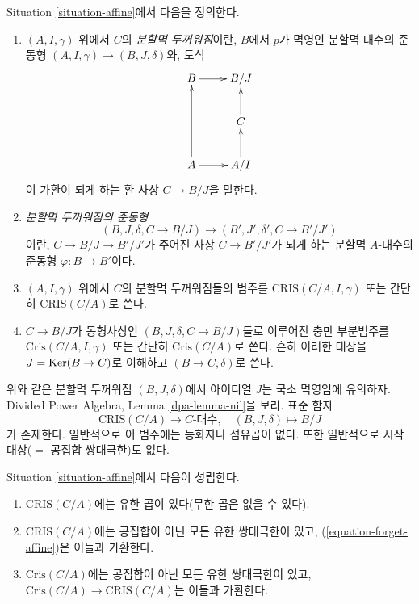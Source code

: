 \begin{definition}
\label{definition-affine-thickening}
Situation \ref{situation-affine}에서 다음을 정의한다.
\begin{enumerate}
\item $(A, I, \gamma)$ 위에서 $C$의 {\it 분할멱 두꺼워짐}이란,
$B$에서 $p$가 멱영인 분할멱 대수의 준동형
$(A, I, \gamma) \to (B, J, \delta)$와, 도식
$$
\xymatrix{
B \ar[r] & B/J \\
& C \ar[u] \\
A \ar[uu] \ar[r] & A/I \ar[u]
}
$$
이 가환이 되게 하는 환 사상 $C \to B/J$을 말한다.
\item {\it 분할멱 두꺼워짐의 준동형}
$$
(B, J, \delta, C \to B/J) \longrightarrow (B', J', \delta', C \to B'/J')
$$
이란, $C \to B/J \to B'/J'$가 주어진 사상 $C \to B'/J'$가
되게 하는 분할멱 $A$-대수의 준동형 $\varphi : B \to B'$이다.
\item $(A, I, \gamma)$ 위에서 $C$의 분할멱 두꺼워짐들의 범주를
$\text{CRIS}(C/A, I, \gamma)$ 또는 간단히 $\text{CRIS}(C/A)$로 쓴다.
\item $C \to B/J$가 동형사상인 $(B, J, \delta, C \to B/J)$들로
이루어진 충만 부분범주를 $\text{Cris}(C/A, I, \gamma)$ 또는
간단히 $\text{Cris}(C/A)$로 쓴다. 흔히 이러한 대상을
$J = \mathop{\mathrm{Ker}}(B \to C)$로 이해하고 $(B \to C, \delta)$로 쓴다.
\end{enumerate}
\end{definition}

\noindent
위와 같은 분할멱 두꺼워짐 $(B, J, \delta)$에서 아이디얼 $J$는
국소 멱영임에 유의하자. Divided Power Algebra,
Lemma \ref{dpa-lemma-nil}을 보라. 표준 함자
\begin{equation}
\label{equation-forget-affine}
\text{CRIS}(C/A) \longrightarrow C\text{-대수},\quad
(B, J, \delta) \longmapsto B/J
\end{equation}
가 존재한다. 일반적으로 이 범주에는 등화자나 섬유곱이 없다.
또한 일반적으로 시작 대상($=$ 공집합 쌍대극한)도 없다.

\begin{lemma}
\label{lemma-affine-thickenings-colimits}
Situation \ref{situation-affine}에서 다음이 성립한다.
\begin{enumerate}
\item $\text{CRIS}(C/A)$에는 유한 곱이 있다(무한 곱은 없을 수 있다).
\item $\text{CRIS}(C/A)$에는 공집합이 아닌 모든 유한 쌍대극한이 있고,
(\ref{equation-forget-affine})은 이들과 가환한다.
\item $\text{Cris}(C/A)$에는 공집합이 아닌 모든 유한 쌍대극한이 있고,
$\text{Cris}(C/A) \to \text{CRIS}(C/A)$는 이들과 가환한다.
\end{enumerate}
\end{lemma}

